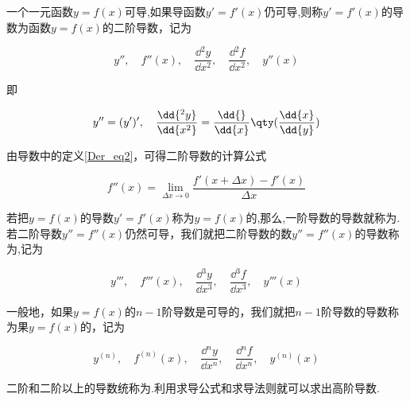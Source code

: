 


一个一元函数$y=f(x)$可导,如果导函数$y'=f'(x)$仍可导,则称$y'=f'(x)$的导数为函数$y=f(x)$的二阶导数，记为

\begin{equation}
y'',\quad f''(x),\quad \frac{\dd{^2y}}{\dd{x^2}},\quad \frac{\dd{^2f}}{\dd{x^2}},\quad y''(x)
\end{equation}

即

\begin{equation}
y''=(y')',\quad\frac{\dd{^2y}}{\dd{x^2}}=\frac{\dd{ }}{\dd{x}}\qty(\frac{\dd{x}}{\dd{y}})
\end{equation}

由导数中的定义\autoref{Der_eq2}，可得二阶导数的计算公式

\begin{equation}
f''(x)=\lim_{\Delta x \to 0} \frac{f'(x+ \Delta x)-f'(x)}{\Delta x}
\end{equation}

若把$y=f(x)$的导数$y'=f'(x)$称为$y=f(x)$的,那么,一阶导数的导数就称为.若二阶导数$y''=f''(x)$仍然可导，我们就把二阶导数的数$y''=f''(x)$的导数称为,记为

\begin{equation}
y''',\quad f'''(x),\quad \frac{\dd{^3y}}{\dd{x^3}},\quad \frac{\dd{^3f}}{\dd{x^3}},\quad y'''(x)
\end{equation}

一般地，如果$y=f(x)$的$n-1$阶导数是可导的，我们就把$n-1$阶导数的导数称为果$y=f(x)$的，记为

\begin{equation}
y^{(n)},\quad f^{(n)}(x),\quad \frac{\dd{^ny}}{\dd{x^n}},\quad \frac{\dd{^nf}}{\dd{x^n}},\quad y^{(n)}(x)
\end{equation}

二阶和二阶以上的导数统称为.利用求导公式和求导法则就可以求出高阶导数.















